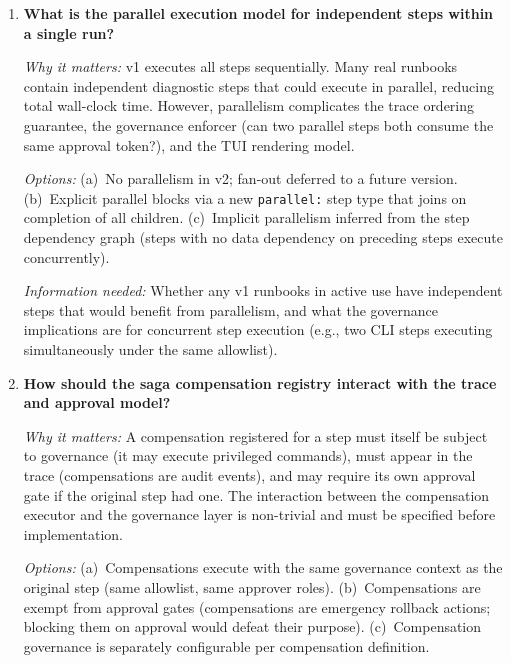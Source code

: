 \begin{enumerate}[label=\textbf{Q\arabic*.}]
    \textit{Information needed:} Benchmarking of event delivery latency over JSON-RPC stdio versus
    gRPC under realistic VS~Code workloads (step execution at 100ms/step, TUI refresh at 60fps
    equivalent). Also requires a determination of whether VS~Code's Node.js extension host supports
    gRPC client libraries without native module issues.

  \item \textbf{What is the parallel execution model for independent steps within a single run?}

    \textit{Why it matters:} v1 executes all steps sequentially. Many real runbooks contain
    independent diagnostic steps that could execute in parallel, reducing total wall-clock time.
    However, parallelism complicates the trace ordering guarantee, the governance enforcer (can two
    parallel steps both consume the same approval token?), and the TUI rendering model.

    \textit{Options:} (a)~No parallelism in v2; fan-out deferred to a future version. (b)~Explicit
    parallel blocks via a new \texttt{parallel:} step type that joins on completion of all children.
    (c)~Implicit parallelism inferred from the step dependency graph (steps with no data dependency
    on preceding steps execute concurrently).

    \textit{Information needed:} Whether any v1 runbooks in active use have independent steps that
    would benefit from parallelism, and what the governance implications are for concurrent step
    execution (e.g., two CLI steps executing simultaneously under the same allowlist).

  \item \textbf{How should the saga compensation registry interact with the trace and approval model?}

    \textit{Why it matters:} A compensation registered for a step must itself be subject to
    governance (it may execute privileged commands), must appear in the trace (compensations are
    audit events), and may require its own approval gate if the original step had one. The
    interaction between the compensation executor and the governance layer is non-trivial and must
    be specified before implementation.

    \textit{Options:} (a)~Compensations execute with the same governance context as the original
    step (same allowlist, same approver roles). (b)~Compensations are exempt from approval gates
    (compensations are emergency rollback actions; blocking them on approval would defeat their
    purpose). (c)~Compensation governance is separately configurable per compensation definition.


\end{enumerate}

